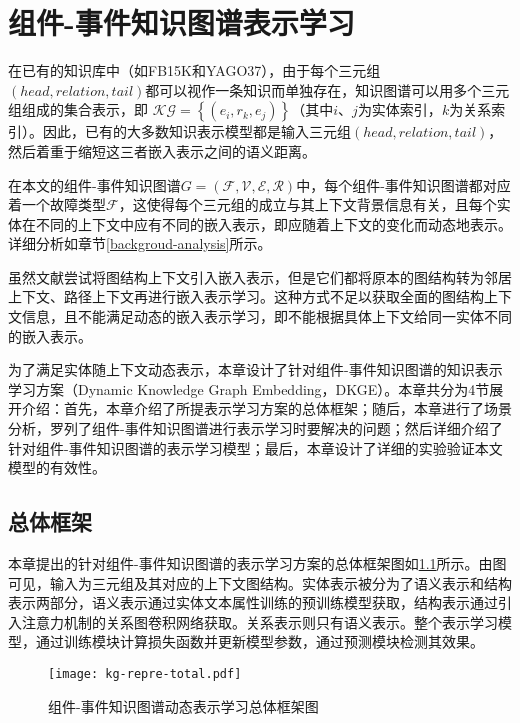 \chapter{组件-事件知识图谱表示学习}\label{chapter-3}
在已有的知识库中（如FB15K\cite{bordes2013translatingE}和YAGO37\cite{guo2018knowledge}），由于每个三元组$\left(head, relation, tail\right)$都可以视作一条知识而单独存在，知识图谱可以用多个三元组组成的集合表示，即 $\mathcal{KG}=\left\{\left(e_{i}, r_{k}, e_{j}\right)\right\}$（其中$i$、$j$为实体索引，$k$为关系索引）。因此，已有的大多数知识表示模型都是输入三元组$\left(head, relation, tail\right)$，然后着重于缩短这三者嵌入表示之间的语义距离。

在本文的组件-事件知识图谱$G=(\mathcal{F}, \mathcal{V}, \mathcal{E}, \mathcal{R})$中，每个组件-事件知识图谱都对应着一个故障类型$\mathcal{F}$，这使得每个三元组的成立与其上下文背景信息有关，且每个实体在不同的上下文中应有不同的嵌入表示，即应随着上下文的变化而动态地表示。详细分析如章节\ref{backgroud-analysis}所示。

虽然文献\parencite{feng2016gake,shi2017knowledge}尝试将图结构上下文引入嵌入表示，但是它们都将原本的图结构转为邻居上下文、路径上下文再进行嵌入表示学习。这种方式不足以获取全面的图结构上下文信息，且不能满足动态的嵌入表示学习，即不能根据具体上下文给同一实体不同的嵌入表示。

为了满足实体随上下文动态表示，本章设计了针对组件-事件知识图谱的知识表示学习方案（Dynamic Knowledge Graph Embedding，DKGE）。本章共分为4节展开介绍：首先，本章介绍了所提表示学习方案的总体框架；随后，本章进行了场景分析，罗列了组件-事件知识图谱进行表示学习时要解决的问题；然后详细介绍了针对组件-事件知识图谱的表示学习模型；最后，本章设计了详细的实验验证本文模型的有效性。
\section{总体框架}
本章提出的针对组件-事件知识图谱的表示学习方案的总体框架图如\ref{kg-repre-total}所示。由图可见，输入为三元组及其对应的上下文图结构。实体表示被分为了语义表示和结构表示两部分，语义表示通过实体文本属性训练的预训练模型获取，结构表示通过引入注意力机制的关系图卷积网络获取。关系表示则只有语义表示。整个表示学习模型，通过训练模块计算损失函数并更新模型参数，通过预测模块检测其效果。
\begin{figure}[htbp]
    \centering
    \texttt{[image: kg-repre-total.pdf]}
    \caption{组件-事件知识图谱动态表示学习总体框架图\label{kg-repre-total}}
\end{figure}

